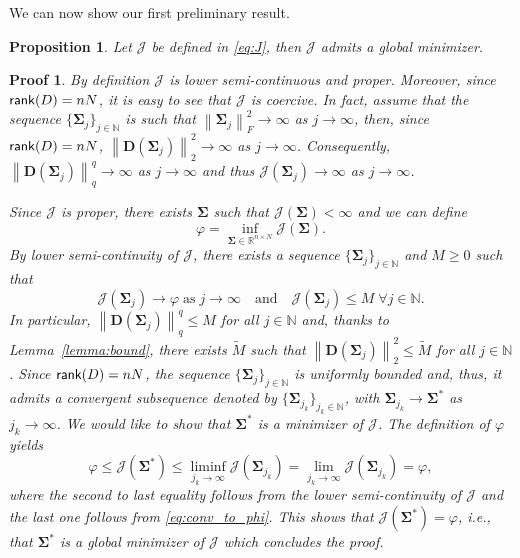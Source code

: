 \documentclass[final,leqno]{siamltex}
\newtheorem{prop}[theorem]{Proposition}
\newtheorem{prf}[theorem]{Proof}
\newcommand{\R}{{\mathbb R}}
\newcommand{\N}{{\mathbb N}}
\newcommand{\ts}[1]{\mbox{\textsf{#1}}}
\newcommand{\norm}[1]{\left\| #1 \right\|}
\newcommand{\Sigmab}{\mathbf{\Sigma}}
\begin{document}
We can now show our first preliminary result.
\begin{prop}\label{prop:existence}
Let $\mathcal{J}$ be defined in \eqref{eq:J}, then $\mathcal{J}$ admits a global minimizer.
\end{prop}
\begin{prf}
	By definition $\mathcal{J}$ is lower semi-continuous and proper. Moreover, since $\ts{rank}(D)=nN$, it is easy to see that $\mathcal{J}$ is coercive. In fact, assume that the sequence $\{\Sigmab_j\}_{j\in\N}$ is such that $\norm{\Sigmab_j}_F^2\rightarrow\infty$ as $j\rightarrow\infty$, then, since $\ts{rank}(D)=nN$, $\norm{\mathbf{D}(\Sigmab_j)}_2^2\rightarrow\infty$ as $j\rightarrow\infty$. Consequently, $\norm{\mathbf{D}(\Sigmab_j)}_q^q\rightarrow\infty$ as $j\rightarrow\infty$ and thus $\mathcal{J}(\Sigmab_j)\rightarrow\infty$ as $j\rightarrow\infty$.
	
	Since $\mathcal{J}$ is proper, there exists $\Sigmab$ such that $\mathcal{J}(\Sigmab)<\infty$ and we can define
	$$
	\varphi=\inf_{\Sigmab\in\R^{n \times N}}\mathcal{J}(\Sigmab).
	$$
	By lower semi-continuity of $\mathcal{J}$, there exists a sequence $\{\Sigmab_j\}_{j\in\N}$ and $M\geq0$ such that 
	\begin{equation}\label{eq:conv_to_phi}
	\mathcal{J}(\Sigmab_j)\rightarrow\varphi \;\mbox{as}\; j\rightarrow\infty\quad\mbox{and}\quad\mathcal{J}(\Sigmab_j)\leq M\;\forall j\in\N.
	\end{equation}
	In particular, $\norm{\mathbf{D}(\Sigmab_j)}_q^q\leq M$ for all $j\in\N$ and, thanks to Lemma~\ref{lemma:bound}, there exists $\widetilde{M}$ such that $\norm{\mathbf{D}(\Sigmab_j)}_2^2\leq \widetilde{M}$ for all $j\in\N$. Since $\ts{rank}({D})=nN$, the sequence  $\{\Sigmab_j\}_{j\in\N}$ is uniformly bounded and, thus, it admits a convergent subsequence denoted by $\{\Sigmab_{j_k}\}_{j_k\in\N}$, with $\Sigmab_{j_k}\rightarrow\Sigmab^*$ as $j_k\rightarrow\infty$. We would like to show that $\Sigmab^*$ is a minimizer of $\mathcal{J}$. The definition of $\varphi$ yields
	\begin{equation*}
	\varphi\leq\mathcal{J}(\Sigmab^*)\leq\liminf_{j_k\rightarrow\infty}\mathcal{J}(\Sigmab_{j_k})=\lim_{j_k\rightarrow\infty}\mathcal{J}(\Sigmab_{j_k})=\varphi,
	\end{equation*}
	where the second to last equality follows from the lower semi-continuity of $\mathcal{J}$ and the last one follows from \eqref{eq:conv_to_phi}. This shows that $\mathcal{J}(\Sigmab^*)=\varphi$, i.e., that $\Sigmab^*$ is a global minimizer of $\mathcal{J}$ which concludes the proof.
\end{prf}
\end{document}
